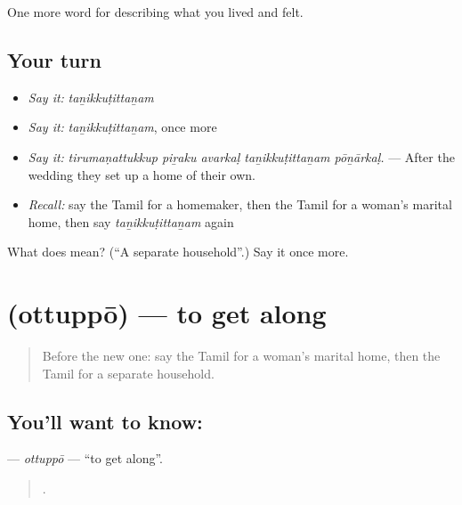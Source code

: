 \begin{grammarlens}[title={What you've built}]
One more word for describing what you lived and felt.
\end{grammarlens}

\subsection*{Your turn}
\begin{itemize}
\raggedright
  \item \emph{Say it:} \emph{taṉikkuṭittaṉam}
  \item \emph{Say it:} \emph{taṉikkuṭittaṉam}, once more
  \item \emph{Say it:} \emph{tirumaṇattukkup piṟaku avarkaḷ taṉikkuṭittaṉam pōṉārkaḷ.} — After the wedding they set up a home of their own.
  \item \emph{Recall:} say the Tamil for a homemaker, then the Tamil for a woman’s marital home, then say \emph{taṉikkuṭittaṉam} again
\end{itemize}

\begin{tcolorbox}[breakable,colback=teal!4,colframe=teal!35!black,title={Before you move on}]
What does  mean? (\textquotedblleft{}A separate household\textquotedblright{}.) Say it once more.
\end{tcolorbox}
\section[\texorpdfstring{\ta{ஒத்துப்போ} (ottuppō)}{ஒத்துப்போ (ottuppō)}]{ (ottuppō) — to get along}

\label{lesson:TA-C500-ottuppo}



\begin{quote}
Before the new one: say the Tamil for a woman’s marital home, then the Tamil for a separate household.
\end{quote}

\subsection*{You'll want to know: }
\textbf{} — \emph{ottuppō} — \textquotedblleft{}to get along\textquotedblright{}.

\begin{quote}
    .
\end{quote}

